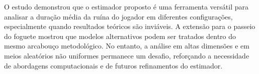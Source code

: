 \documentclass[a4paper,10pt,twocolumn]{article}
\begin{document}
O estudo demonstrou que o estimador proposto é uma ferramenta versátil para
analisar a duração média da ruína do jogador em diferentes configurações,
especialmente quando resultados teóricos são inviáveis. A extensão para o
passeio do foguete mostrou que modelos alternativos podem ser tratados dentro do
mesmo arcabouço metodológico. No entanto, a análise em altas dimensões e em
meios aleatórios não uniformes permanece um desafio, reforçando a necessidade de
abordagens computacionais e de futuros refinamentos do estimador.

\vspace{2.5pt}


\end{document}
